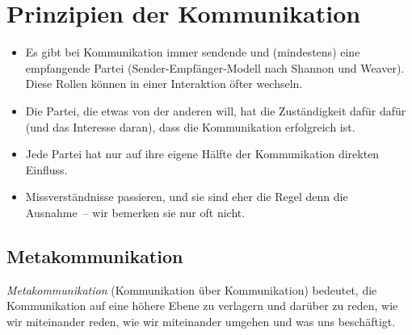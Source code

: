 \section{Prinzipien der Kommunikation}
\label{kommunikationsprinzipien}

\begin{itemize}
  \item Es gibt bei Kommunikation immer sendende und (mindestens) eine empfangende Partei (Sender-Empfänger-Modell nach Shannon und Weaver). Diese Rollen können in einer Interaktion öfter wechseln.
  \item Die Partei, die etwas von der anderen will, hat die Zuständigkeit dafür dafür (und das Interesse daran), dass die Kommunikation erfolgreich ist.
  \item Jede Partei hat nur auf ihre eigene Hälfte der Kommunikation direkten Einfluss.
  \item Missverständnisse passieren, und sie sind eher die Regel denn die Ausnahme~-- wir bemerken sie nur oft nicht.
\end{itemize}


\subsection{Metakommunikation}
\label{metakommunikation}

\emph{Metakommunikation} (\glqq Kommunikation über Kommunikation\grqq) bedeutet, die Kommunikation auf eine höhere Ebene zu verlagern und darüber zu reden, wie wir miteinander reden, wie wir miteinander umgehen und was uns beschäftigt.
